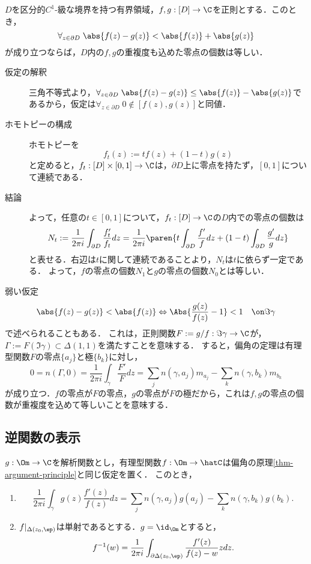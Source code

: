 \documentclass[uplatex, dvipdfmx]{jsreport}
\begin{document}
\begin{corollary}[Rouche]
    $D$を区分的$C^1$-級な境界を持つ有界領域，$f,g:[D]\to\C$を正則とする．このとき，
    \[\forall_{z\in\partial D}\;\abs{f(z)-g(z)}<\abs{f(z)}+\abs{g(z)}\]
    が成り立つならば，$D$内の$f,g$の重複度も込めた零点の個数は等しい．
\end{corollary}
\begin{Proof}\mbox{}
    \begin{description}
        \item[仮定の解釈] 三角不等式より，$\forall_{z\in\partial D}\;\abs{f(z)-g(z)}\le\abs{f(z)}-\abs{g(z)}$であるから，仮定は$\forall_{z\in\partial D}\;0\notin[f(z),g(z)]$と同値．
        \item[ホモトピーの構成] ホモトピーを
        \[f_t(z):=tf(z)+(1-t)g(z)\]
        と定めると，$f_t:[D]\times[0,1]\to\C$は，$\partial D$上に零点を持たず，$[0,1]$について連続である．
        \item[結論] 
        よって，任意の$t\in[0,1]$について，$f_t:[D]\to\C$の$D$内での零点の個数は
        \[N_t:=\frac{1}{2\pi i}\int_{\partial D}\frac{f'_t}{f_t}dz=\frac{1}{2\pi i}\paren{t\int_{\partial D}\frac{f'}{f}dz+(1-t)\int_{\partial D}\frac{g'}{g}dz}\]
        と表せる．右辺は$t$に関して連続であることより，$N_t$は$t$に依らず一定である．
        よって，$f$の零点の個数$N_1$と$g$の零点の個数$N_0$とは等しい．
    \end{description}
\end{Proof}
\begin{remarks}
    弱い仮定
    \[\abs{f(z)-g(z)}<\abs{f(z)}\Leftrightarrow\Abs{\frac{g(z)}{f(z)}-1}<1\quad\on\Im\gamma\]
    で述べられることもある．
    これは，正則関数$F:=g/f:\Im\gamma\to\C$が，$\Gamma:=F(\Im\gamma)\subset\Delta(1,1)$を満たすことを意味する．
    すると，偏角の定理は有理型関数$F$の零点$\{a_j\}$と極$\{b_k\}$に対し，
    \[0=n(\Gamma,0)=\frac{1}{2\pi i}\int_\gamma\frac{F'}{F}dz=\sum_jn(\gamma,a_j)m_{a_j}-\sum_kn(\gamma,b_k)m_{b_k}\]
    が成り立つ．$f$の零点が$F$の零点，$g$の零点が$F$の極だから，これは$f,g$の零点の個数が重複度を込めて等しいことを意味する．
\end{remarks}

\subsection{逆関数の表示}

\begin{corollary}
    $g:\Om\to\C$を解析関数とし，有理型関数$f:\Om\to\hatC$は偏角の原理\ref{thm-argument-principle}と同じ仮定を置く．
    このとき，
    \begin{enumerate}
        \item \[\frac{1}{2\pi i}\int_\gamma g(z)\frac{f'(z)}{f(z)}dz=\sum_jn(\gamma,a_j)g(a_j)-\sum_kn(\gamma,b_k)g(b_k).\]
        \item $f|_{\Delta(z_0,\ep)}$は単射であるとする．$g=\id_\Om$とすると，
        \[f^{-1}(w)=\frac{1}{2\pi i}\int_{\partial\Delta(z_0,\ep)}\frac{f'(z)}{f(z)-w}zdz.\]
    \end{enumerate}
\end{corollary}
\end{document}
